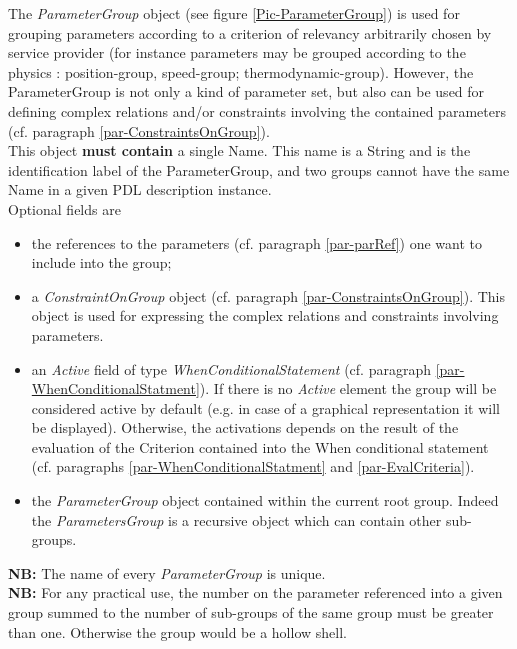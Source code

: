 \documentclass[a4paper,11pt] {ivoa}
\begin{document}
The {\it ParameterGroup} object (see figure \ref{Pic-ParameterGroup}) is used for grouping
parameters according to a criterion of relevancy arbitrarily chosen by service provider (for instance
parameters may be grouped according to the physics : position-group, speed-group; thermodynamic-group).
However,  the ParameterGroup is not only a kind of parameter set, but also can be used for
defining complex relations and/or constraints involving the contained parameters (cf. paragraph
\ref{par-ConstraintsOnGroup}).\\
This object {\bf must contain} a single Name. This name is a String and is the identification label
of the ParameterGroup, and two groups cannot have the same Name in a given PDL description instance.\\
Optional fields are
\begin{itemize}
\item the references to the parameters (cf. paragraph \ref{par-parRef}) one want to include into the
group;
\item a {\it ConstraintOnGroup} object (cf. paragraph 
\ref{par-ConstraintsOnGroup}). This object is used for expressing the complex relations and
constraints involving parameters.
\item an  {\it Active} field of type {\it WhenConditionalStatement} (cf. paragraph \ref{par-WhenConditionalStatment}). If there is no {\it Active} element the group will be considered active by default  (e.g. in case of a graphical representation it will be displayed). Otherwise, the activations depends on the result of the evaluation of the Criterion contained into the  When conditional statement (cf. paragraphs \ref{par-WhenConditionalStatment} and \ref{par-EvalCriteria}).
\item the {\it ParameterGroup} object contained within the current root group. Indeed the
{\it ParametersGroup} is a recursive object which can contain other sub-groups.
\end{itemize}

{\bf NB:} The name of every {\it ParameterGroup} is unique.\\

{\bf NB:}  For any practical use, the number on the parameter referenced into a given group summed
to the number of sub-groups of the same group must be greater than one. Otherwise the group would be
a hollow shell.
\end{document}
